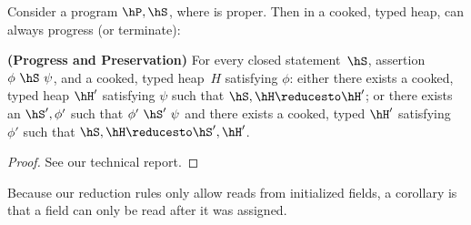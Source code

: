 Consider a program $\hP,\hS$, where \hP is proper.  Then in a cooked,
typed heap, \hS can always progress (or terminate):

\begin{Theorem}[preservation]
  \textbf{(Progress and Preservation)} For every closed
  statement~$\hS$, assertion $\phi~\hS~\psi$, and a cooked, typed
  heap~$H$ satisfying $\phi$: either there exists a cooked, typed heap $\hH'$
  satisfying $\psi$ such that $\hS,\hH \reducesto \hH'$; or there
  exists an $\hS',\phi'$ such that $\phi'~\hS'~\psi$ and there exists
  a cooked, typed $\hH'$ satisfying $\phi'$ such that $\hS,\hH \reducesto
  \hS',\hH'$.

\end{Theorem}
\begin{proof}
See our technical report.
\end{proof}
Because our reduction rules only allow reads from initialized fields,
a corollary is that a field can only be read after it was assigned.
